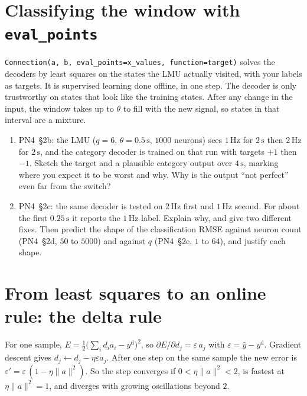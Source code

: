 \documentclass[11pt,letterpaper]{article}
\begin{document}
\section{Classifying the window with \texttt{eval\_points}}

\begin{idea}
\texttt{Connection(a, b, eval\_points=x\_values, function=target)} solves the decoders by least squares on the states the LMU actually visited, with your labels as targets. It is supervised learning done offline, in one step. The decoder is only trustworthy on states that look like the training states. After any change in the input, the window takes up to $\theta$ to fill with the new signal, so states in that interval are a mixture.
\end{idea}

\begin{enumerate}
\item PN4~\S2b: the LMU ($q = 6$, $\theta = 0.5\,\mathrm{s}$, $1000$ neurons) sees $1\,\mathrm{Hz}$ for $2\,\mathrm{s}$ then $2\,\mathrm{Hz}$ for $2\,\mathrm{s}$, and the category decoder is trained on that run with targets $+1$ then $-1$. Sketch the target and a plausible category output over $4\,\mathrm{s}$, marking where you expect it to be worst and why. Why is the output ``not perfect'' even far from the switch?
\item PN4~\S2c: the same decoder is tested on $2\,\mathrm{Hz}$ first and $1\,\mathrm{Hz}$ second. For about the first $0.25\,\mathrm{s}$ it reports the $1\,\mathrm{Hz}$ label. Explain why, and give two different fixes. Then predict the shape of the classification RMSE against neuron count (PN4~\S2d, $50$ to $5000$) and against $q$ (PN4~\S2e, $1$ to $64$), and justify each shape.
\end{enumerate}

\section{From least squares to an online rule: the delta rule}

\begin{idea}
For one sample, $E = \tfrac12\bigl(\sum_i d_ia_i - y^{\mathrm d}\bigr)^2$, so $\partial E/\partial d_j = \varepsilon\,a_j$ with $\varepsilon = \hat y - y^{\mathrm d}$. Gradient descent gives $d_j \leftarrow d_j - \eta\varepsilon a_j$. After one step on the same sample the new error is $\varepsilon' = \varepsilon\,(1 - \eta\|a\|^2)$. So the step converges if $0 < \eta\|a\|^2 < 2$, is fastest at $\eta\|a\|^2 = 1$, and diverges with growing oscillations beyond $2$.
\end{idea}
\end{document}
